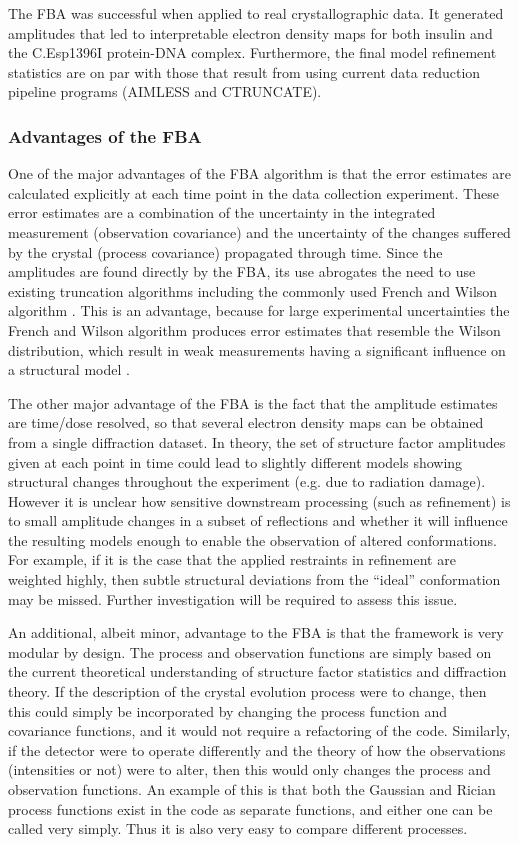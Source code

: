 The FBA was successful when applied to real crystallographic data.
It generated amplitudes that led to interpretable electron density maps for both insulin and the C.Esp1396I protein-DNA complex.
Furthermore, the final model refinement statistics are on par with those that result from using current data reduction pipeline programs (AIMLESS and CTRUNCATE).

\subsubsection{Advantages of the FBA}
\label{subs:Advantages of the FBA}
One of the major advantages of the FBA algorithm is that the error estimates are calculated explicitly at each time point in the data collection experiment.
These error estimates are a combination of the uncertainty in the integrated measurement (observation covariance) and the uncertainty of the changes suffered by the crystal (process covariance) propagated through time.
Since the amplitudes are found directly by the FBA, its use abrogates the need to use existing truncation algorithms including the commonly used French and Wilson algorithm \cite{french1978treatment}.
This is an advantage, because for large experimental uncertainties the French and Wilson algorithm produces error estimates that resemble the Wilson distribution, which result in weak measurements having a significant influence on a structural model \cite{read2015log}.

The other major advantage of the FBA is the fact that the amplitude estimates are time/dose resolved, so that several electron density maps can be obtained from a single diffraction dataset.
In theory, the set of structure factor amplitudes given at each point in time could lead to slightly different models showing structural changes throughout the experiment (e.g. due to radiation damage).
However it is unclear how sensitive downstream processing (such as refinement) is to small amplitude changes in a subset of reflections and whether it will influence the resulting models enough to enable the observation of altered conformations.
For example, if it is the case that the applied restraints in refinement are weighted highly, then subtle structural deviations from the ``ideal'' conformation may be missed.
Further investigation will be required to assess this issue.

An additional, albeit minor, advantage to the FBA is that the framework is very modular by design.
The process and observation functions are simply based on the current theoretical understanding of structure factor statistics and diffraction theory.
If the description of the crystal evolution process were to change, then this could simply be incorporated by changing the process function and covariance functions, and it would not require a refactoring of the code.
Similarly, if the detector were to operate differently and the theory of how the observations (intensities or not) were to alter, then this would only changes the process and observation functions.
An example of this is that both the Gaussian and Rician process functions exist in the code as separate functions, and either one can be called very simply.
Thus it is also very easy to compare different processes.

